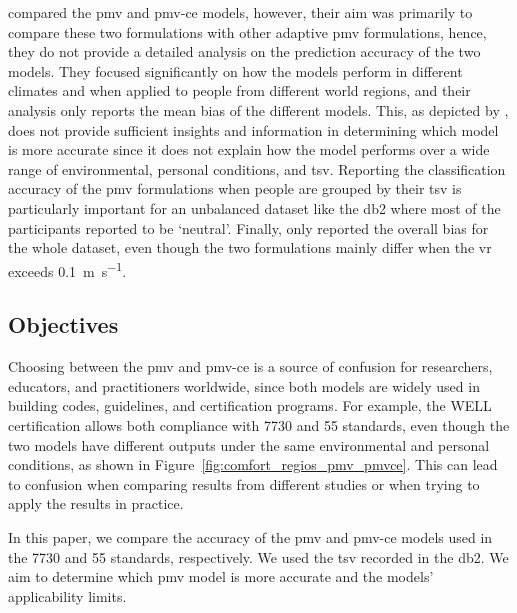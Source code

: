  compared the \ac{pmv} and \ac{pmv-ce} models, however, their aim was primarily to compare these two formulations with other adaptive \ac{pmv} formulations, hence, they do not provide a detailed analysis on the prediction accuracy of the two models.
They focused significantly on how the models perform in different climates and when applied to people from different world regions, and their analysis only reports the mean bias of the different models.
This, as depicted by , does not provide sufficient insights and information in determining which model is more accurate since it does not explain how the model performs over a wide range of environmental, personal conditions, and \ac{tsv}.
Reporting the classification accuracy of the \ac{pmv} formulations when people are grouped by their \ac{tsv} is particularly important for an unbalanced dataset like the \ac{db2} where most of the participants reported to be `neutral'.
Finally,  only reported the overall bias for the whole dataset, even though the two formulations mainly differ when the \ac{vr} exceeds \qty{0.1}{\m\per\s}.

\subsection{Objectives}\label{subsec:aim-and-objectives}
Choosing between the \ac{pmv} and \ac{pmv-ce} is a source of confusion for researchers, educators, and practitioners worldwide, since both models are widely used in building codes, guidelines, and certification programs.
For example, the WELL certification allows both compliance with \gls{7730} and \gls{55} standards, even though the two models have different outputs under the same environmental and personal conditions, as shown in Figure~\ref{fig:comfort_regios_pmv_pmvce}.
This can lead to confusion when comparing results from different studies or when trying to apply the results in practice.

In this paper, we compare the accuracy of the \ac{pmv} and \ac{pmv-ce} models used in the \gls{7730} and \gls{55} standards, respectively.
We used the \ac{tsv} recorded in the \acf{db2}.
We aim to determine which \ac{pmv} model is more accurate and the models' applicability limits.